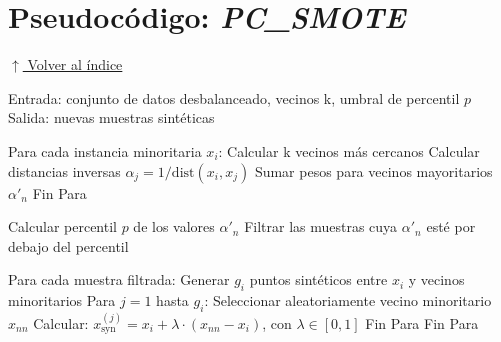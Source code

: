 \section*{Pseudocódigo: \textit{PC\_SMOTE}}
\noindent\hypertarget{pseudocodigo_pc_smote}{}\hyperlink{toc}{\small$\uparrow$ Volver al índice}

\begin{pseudo}
Entrada: conjunto de datos desbalanceado, vecinos k, umbral de percentil \( p \)  
Salida: nuevas muestras sintéticas

Para cada instancia minoritaria \( x_i \):  
    Calcular k vecinos más cercanos  
    Calcular distancias inversas \( \alpha_j = 1 / \text{dist}(x_i, x_j) \)  
    Sumar pesos para vecinos mayoritarios \( \alpha'_n \)  
Fin Para

Calcular percentil \( p \) de los valores \( \alpha'_n \)  
Filtrar las muestras cuya \( \alpha'_n \) esté por debajo del percentil  

Para cada muestra filtrada:  
    Generar \( g_i \) puntos sintéticos entre \( x_i \) y vecinos minoritarios  
    Para \( j = 1 \) hasta \( g_i \):  
        Seleccionar aleatoriamente vecino minoritario \( x_{nn} \)  
        Calcular: \( x^{(j)}_{\text{syn}} = x_i + \lambda \cdot (x_{nn} - x_i) \), con \( \lambda \in [0, 1] \)  
    Fin Para  
Fin Para
\end{pseudo}